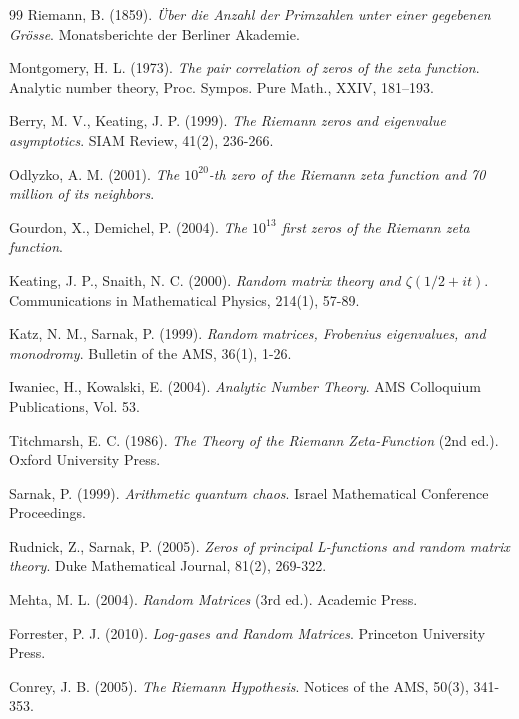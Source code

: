\documentclass[12pt, a4paper]{article}
\theoremstyle{plain}
\theoremstyle{definition}
\begin{document}
\begin{thebibliography}{99}
 Riemann, B. (1859). \textit{Über die Anzahl der Primzahlen unter einer gegebenen Grösse}. Monatsberichte der Berliner Akademie.

 Montgomery, H. L. (1973). \textit{The pair correlation of zeros of the zeta function}. Analytic number theory, Proc. Sympos. Pure Math., XXIV, 181--193.

 Berry, M. V., Keating, J. P. (1999). \textit{The Riemann zeros and eigenvalue asymptotics}. SIAM Review, 41(2), 236-266.

 Odlyzko, A. M. (2001). \textit{The $10^{20}$-th zero of the Riemann zeta function and 70 million of its neighbors}.

 Gourdon, X., Demichel, P. (2004). \textit{The $10^{13}$ first zeros of the Riemann zeta function}.

 Keating, J. P., Snaith, N. C. (2000). \textit{Random matrix theory and $\zeta(1/2+it)$}. Communications in Mathematical Physics, 214(1), 57-89.

 Katz, N. M., Sarnak, P. (1999). \textit{Random matrices, Frobenius eigenvalues, and monodromy}. Bulletin of the AMS, 36(1), 1-26.

 Iwaniec, H., Kowalski, E. (2004). \textit{Analytic Number Theory}. AMS Colloquium Publications, Vol. 53.

 Titchmarsh, E. C. (1986). \textit{The Theory of the Riemann Zeta-Function} (2nd ed.). Oxford University Press.

 Sarnak, P. (1999). \textit{Arithmetic quantum chaos}. Israel Mathematical Conference Proceedings.

 Rudnick, Z., Sarnak, P. (2005). \textit{Zeros of principal L-functions and random matrix theory}. Duke Mathematical Journal, 81(2), 269-322.

 Mehta, M. L. (2004). \textit{Random Matrices} (3rd ed.). Academic Press.

 Forrester, P. J. (2010). \textit{Log-gases and Random Matrices}. Princeton University Press.

 Conrey, J. B. (2005). \textit{The Riemann Hypothesis}. Notices of the AMS, 50(3), 341-353.


\end{thebibliography}
\end{document}
